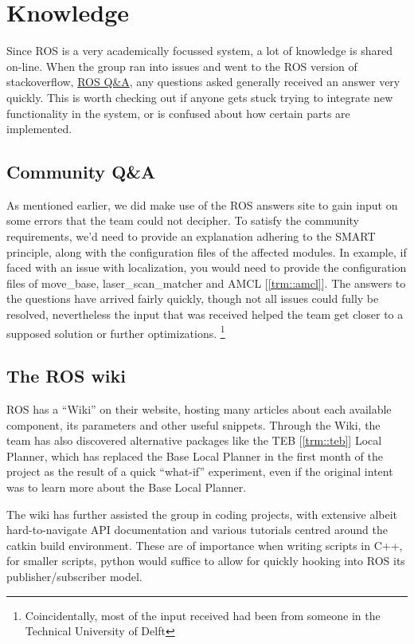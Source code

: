 \section{Knowledge}
Since ROS is a very academically focussed system, a lot of knowledge is shared on-line.
When the group ran into issues and went to the ROS version of stackoverflow, \href{https://answers.ros.org/questions/}{ROS Q\&A}, any questions asked generally received an answer very quickly.
This is worth checking out if anyone gets stuck trying to integrate new functionality in the system, or is confused about how certain parts are implemented.

\subsection{Community Q\&A}
As mentioned earlier, we did make use of the ROS answers site to gain input on some errors that the team could not decipher. 
To satisfy the community requirements, we'd need to provide an explanation adhering to the SMART principle, along with the configuration files of the affected modules.
In example, if faced with an issue with localization, you would need to provide the configuration files of move\_base, laser\_scan\_matcher and AMCL [\ref{trm::amcl}].
The answers to the questions have arrived fairly quickly, though not all issues could fully be resolved, nevertheless the input that was  received helped the team get closer to a supposed solution or further optimizations. 
\footnote{Coincidentally, most of the input received had been from someone in the Technical University of Delft}


\subsection{The ROS wiki}
ROS has a ``Wiki'' \cite{roswiki} on their website, hosting many articles about each available component, its parameters and other useful snippets. 
Through the Wiki, the team has also discovered alternative packages like the TEB [\ref{trm::teb}] Local Planner, which has replaced the Base Local Planner in the first month of the project as the result of a quick  ``what-if'' experiment, even if the original intent was to learn more about the Base Local Planner.

The wiki has further assisted the group in coding projects, with extensive albeit hard-to-navigate API documentation and various tutorials centred around the catkin build environment. 
These are of importance when writing scripts in C++, for smaller scripts, python would suffice to allow for quickly hooking into ROS its publisher/subscriber model.

\newpage
